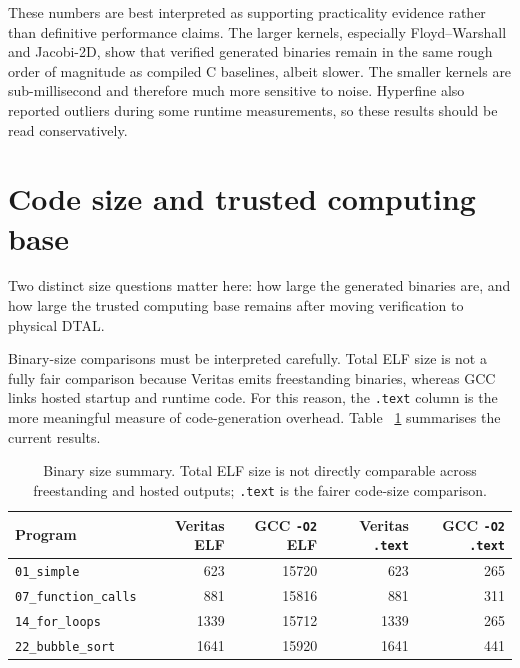 These numbers are best interpreted as supporting practicality evidence rather
than definitive performance claims. The larger kernels, especially
Floyd--Warshall and Jacobi-2D, show that verified generated binaries remain in
the same rough order of magnitude as compiled C baselines, albeit slower. The
smaller kernels are sub-millisecond and therefore much more sensitive to noise.
Hyperfine also reported outliers during some runtime measurements, so these
results should be read conservatively.

\section{Code size and trusted computing base}

Two distinct size questions matter here: how large the generated binaries are,
and how large the trusted computing base remains after moving verification to
physical DTAL.

Binary-size comparisons must be interpreted carefully. Total ELF size is not a
fully fair comparison because Veritas emits freestanding binaries, whereas GCC
links hosted startup and runtime code. For this reason, the \texttt{.text}
column is the more meaningful measure of code-generation overhead. Table
~\ref{tab:binary-size} summarises the current results.

\begin{table}[h]
  \centering
  \small
  \begin{tabular}{l r r r r}
    \hline
    \textbf{Program}             & \textbf{Veritas ELF} & \textbf{GCC \texttt{-O2} ELF} & \textbf{Veritas \texttt{.text}} & \textbf{GCC \texttt{-O2} \texttt{.text}} \\
    \hline
    \texttt{01\_simple}          & 623                  & 15720                         & 623                             & 265                                      \\
    \texttt{07\_function\_calls} & 881                  & 15816                         & 881                             & 311                                      \\
    \texttt{14\_for\_loops}      & 1339                 & 15712                         & 1339                            & 265                                      \\
    \texttt{22\_bubble\_sort}    & 1641                 & 15920                         & 1641                            & 441                                      \\
    \hline
  \end{tabular}
  \caption{Binary size summary. Total ELF size is not directly comparable
    across freestanding and hosted outputs; \texttt{.text} is the fairer code-size
    comparison.}
  \label{tab:binary-size}
\end{table}

